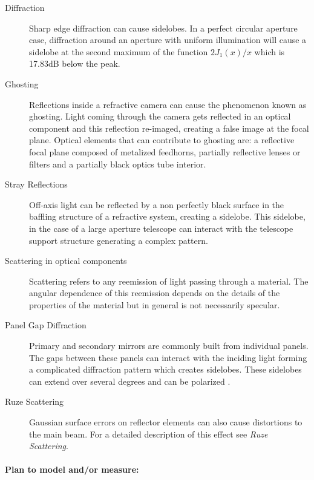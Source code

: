 \begin{description}
\item[Diffraction]

Sharp edge diffraction can cause sidelobes. In a perfect circular aperture case, diffraction around an aperture with uniform illumination will cause a sidelobe at the second maximum of the function $2J_1(x)/x$ which is 17.83dB below the peak.

\item[Ghosting]

Reflections inside a refractive camera can cause the phenomenon known as ghosting. Light coming through the camera gets reflected in an optical component and this reflection re-imaged, creating a false image at the focal plane. Optical elements that can contribute to ghosting are: a reflective focal plane composed of metalized feedhorns, partially reflective lenses or filters and a partially black optics tube interior.

\item[Stray Reflections]

Off-axis light can be reflected by a non perfectly black surface in the baffling structure of a refractive system, creating a sidelobe. This sidelobe, in the case of a large aperture telescope can interact with the telescope support structure generating a complex pattern.

\item[Scattering in optical components]

Scattering refers to any reemission of light passing through a material. The angular dependence of this reemission depends on the details of the properties of the material but in general is not necessarily specular.

\item[Panel Gap Diffraction]
Primary and secondary mirrors are commonly built from individual panels. The gaps between these panels can interact with the inciding light forming a complicated diffraction pattern which creates sidelobes. These sidelobes can extend over several degrees and can be polarized \cite{fluxa_rojas_far_2016}.

\item[Ruze Scattering]
Gaussian surface errors on reflector elements can also cause distortions to the main beam. For a detailed description of this effect see \emph{Ruze Scattering}.

\end{description}

\paragraph{Plan to model and/or measure:}

